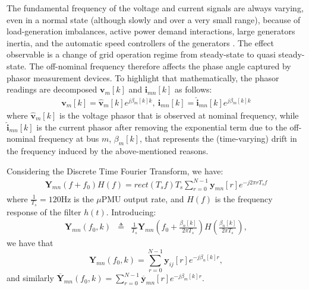 \documentclass[twocolumn]{IEEEtran}
\newcommand{\mup}{\mu \text{PMU}}
\newcommand{\bs}{\boldsymbol}
\begin{document}
The fundamental frequency of the voltage and current signals are always varying, even in a normal state (although slowly and over a very small range), because of load-generation imbalances, active power demand interactions, large generators inertia, and the automatic speed controllers of the generators \cite{phadke2008synchronized}. The effect observable is a change of grid operation regime from steady-state to quasi steady-state. 
The off-nominal frequency therefore affects the phase angle captured by phasor measurement devices. To highlight that mathematically, the phasor readings are decomposed ${\mathbf{v}}_m[k]$ and $\mathbf{i}_{mn}[k]$ as follows:
\begin{align}
\mathbf{v}_m[k]=\hat{\mathbf{v}}_m[k] e^{j \beta_m[k]k}, 
~ \mathbf{i}_{mn}[k]=\hat{\mathbf{i}}_{mn}[k] e^{j \beta_m[k]k}
\label{eq:V_k_I_ij}
\end{align}
where $\hat{\mathbf{v}}_m[k]$ is the voltage phasor that is observed at nominal frequency, while $\hat{\mathbf{i}}_{mn}[k]$ is the current phasor after removing the exponential term due to the off-nominal frequency at bus $m$, $\beta_m[k]$, that represents the (time-varying) drift in the frequency induced by the above-mentioned reasons. 

Considering the Discrete Time Fourier Transform, we have:
\begin{align}
\bs{Y}_{mn}(f+f_0)H(f)=rect(T_sf)T_s\sum^{N-1}_{r=0}\bs{y}_{mn}[r]e^{-j2\pi rT_sf}
\end{align}
where $\frac{1}{T_s}=120$Hz is the $\mup$ output rate, and $H(f)$ is the frequency response of the filter $h(t)$. Introducing:
\begin{eqnarray}
{\bs{Y}}_{mn}(f_0,k)&\triangleq& \frac{1}{T_s} \bs{Y}_{mn}\!\!\left(f_0+\frac{\beta_n[k]}{2\pi T_s}\right)H\!\left(\frac{\beta_n[k]}{2\pi T_s}\right),
\label{eq:modulated_Y}
\end{eqnarray}
we have that 
\begin{equation}
{\bs{Y}}_{mn}(f_0,k) =\sum_{r=0}^{N-1}\bs{y}_{ij}[r]e^{-j\beta_n[k] r},
\end{equation}
and similarly $\overline{\bs Y}_{mn}(f_0,k)=\sum_{r=0}^{N-1}\overline{\bs{y}}_{mn}[r]e^{-j\beta_m[k] r}$.
\end{document}

